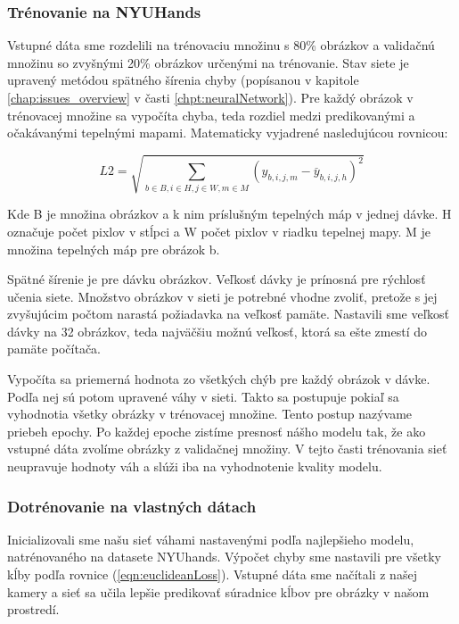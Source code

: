 \subsubsection{Trénovanie na NYUHands}
Vstupné dáta sme rozdelili na trénovaciu množinu s 80\% obrázkov a validačnú množinu so zvyšnými 20\% obrázkov určenými na trénovanie. Stav siete je upravený metódou spätného šírenia chyby (popísanou v kapitole \ref{chap:issues_overview} v časti \ref{chpt:neuralNetwork}). Pre každý obrázok v trénovacej množine sa vypočíta chyba, teda rozdiel medzi predikovanými a očakávanými tepelnými mapami. Matematicky vyjadrené nasledujúcou rovnicou:

\begin{equation}\label{eqn:euclideanLoss}
    L2 = \sqrt{\sum_{b \in B, i \in H, j \in W, m \in M}{\left(y_{b,i,j,m} - \overset{\_}{y}_{b,i,j,h}\right)^{2}}}
\end{equation}

Kde B je množina obrázkov a k nim príslušným tepelných máp v jednej dávke. H označuje počet pixlov v stĺpci a W počet pixlov v riadku tepelnej mapy. M je množina tepelných máp pre obrázok b.

Spätné šírenie je pre dávku obrázkov. Veľkosť dávky je prínosná pre rýchlosť učenia siete. Množstvo obrázkov v sieti je potrebné vhodne zvoliť, pretože s jej zvyšujúcim počtom narastá požiadavka na veľkosť pamäte. Nastavili sme veľkosť dávky na 32 obrázkov, teda najväčšiu možnú veľkosť, ktorá sa ešte zmestí do pamäte počítača. 

Vypočíta sa priemerná hodnota zo všetkých chýb pre každý obrázok v dávke. Podľa nej sú potom upravené váhy v sieti. Takto sa postupuje pokiaľ sa vyhodnotia všetky obrázky v trénovacej množine. Tento postup nazývame priebeh epochy. Po každej epoche zistíme presnosť nášho modelu tak, že ako vstupné dáta zvolíme obrázky z validačnej množiny. V tejto časti trénovania sieť neupravuje hodnoty váh a slúži iba na vyhodnotenie kvality modelu.

\subsubsection{Dotrénovanie na vlastných dátach}
Inicializovali sme našu sieť váhami nastavenými podľa najlepšieho modelu, natrénovaného na datasete NYUhands. Výpočet chyby sme nastavili pre všetky kĺby podľa rovnice (\ref{eqn:euclideanLoss}). Vstupné dáta sme načítali z našej kamery a sieť sa učila lepšie predikovať súradnice kĺbov pre obrázky v našom prostredí.

